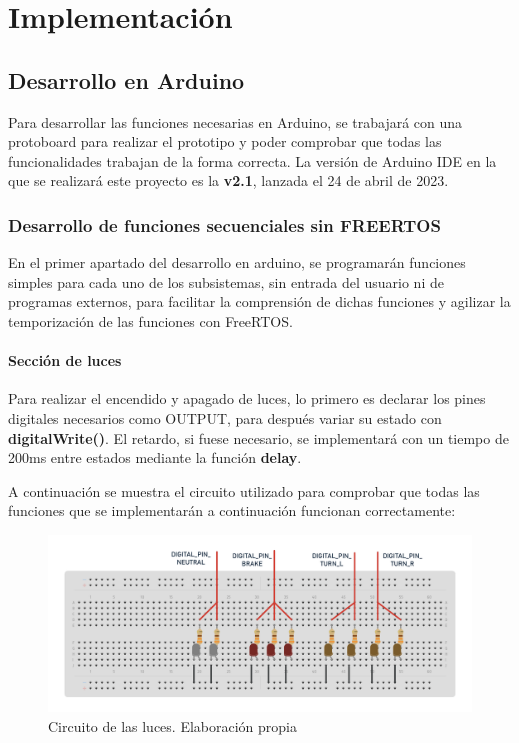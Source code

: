 \chapter{Implementación}


\noindent{}

\section{Desarrollo en Arduino}

Para desarrollar las funciones necesarias en Arduino, se trabajará con una protoboard para realizar el prototipo y poder comprobar que todas las funcionalidades trabajan de la forma correcta. La versión de Arduino IDE en la que se realizará este proyecto es la \textbf{v2.1}, lanzada el 24 de abril de 2023. 

\subsection{Desarrollo de funciones secuenciales sin FREERTOS}

En el primer apartado del desarrollo en arduino, se programarán funciones simples para cada uno de los subsistemas, sin entrada del usuario ni de programas externos, para facilitar la comprensión de dichas funciones y agilizar la temporización de las funciones con FreeRTOS. 

\subsubsection{Sección de luces}

Para realizar el encendido y apagado de luces, lo primero es declarar los pines digitales necesarios como OUTPUT, para después variar su estado con \textbf{digitalWrite()}. El retardo, si fuese necesario, se implementará con un tiempo de 200ms entre estados mediante la función \textbf{delay}.

A continuación se muestra el circuito utilizado para comprobar que todas las funciones que se implementarán a continuación funcionan correctamente: 

\begin{figure}[H]
    \centering
    \includegraphics[width=1\textwidth]{imagenes/diagramas/luces_ard.png}
    \caption{Circuito de las luces. Elaboración propia}
\end{figure}

